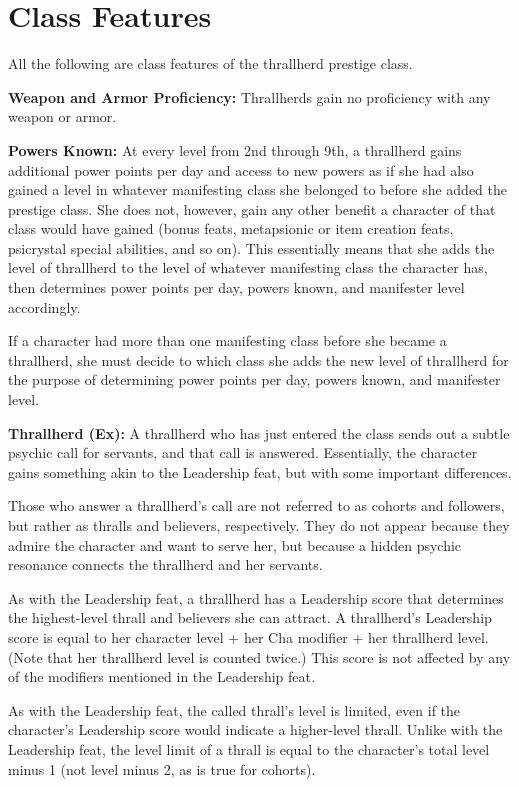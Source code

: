 \documentclass{article}
\begin{document}
\vspace{12pt}
\section*{\textbf{Class Features}}

All the following are class features of the thrallherd prestige class.

\textbf{Weapon and Armor Proficiency:} Thrallherds gain no proficiency with any 
weapon or armor.

\textbf{Powers Known:} At every level from 2nd through 9th, a thrallherd gains 
additional power points per day and access to new powers as if she had also gained 
a level in whatever manifesting class she belonged to before she added the prestige 
class. She does not, however, gain any other benefit a character of that class 
would have gained (bonus feats, metapsionic or item creation feats, psicrystal 
special abilities, and so on). This essentially means that she adds the level of 
thrallherd to the level of whatever manifesting class the character has, then determines 
power points per day, powers known, and manifester level accordingly.

If a character had more than one manifesting class before she became a thrallherd, 
she must decide to which class she adds the new level of thrallherd for the purpose 
of determining power points per day, powers known, and manifester level.

\textbf{Thrallherd (Ex):} A thrallherd who has just entered the class sends out 
a subtle psychic call for servants, and that call is answered. Essentially, the 
character gains something akin to the Leadership feat, but with some important 
differences.

Those who answer a thrallherd's call are not referred to as cohorts and followers, 
but rather as thralls and believers, respectively. They do not appear because they 
admire the character and want to serve her, but because a hidden psychic resonance 
connects the thrallherd and her servants.

As with the Leadership feat, a thrallherd has a Leadership score that determines 
the highest-level thrall and believers she can attract. A thrallherd's Leadership 
score is equal to her character level + her Cha modifier + her thrallherd level. 
(Note that her thrallherd level is counted twice.) This score is not affected by 
any of the modifiers mentioned in the Leadership feat\textit{.}

As with the Leadership feat, the called thrall's level is limited, even if the 
character's Leadership score would indicate a higher-level thrall. Unlike with 
the Leadership feat, the level limit of a thrall is equal to the character's total 
level minus 1 (not level minus 2, as is true for cohorts).
\end{document}
